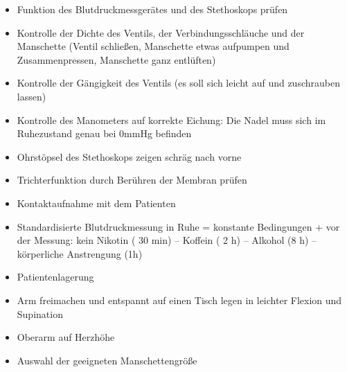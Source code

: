 \documentclass{article}
\begin{document}
\begin{itemize}
\item Funktion des Blutdruckmessger\"ates und des Stethoskops pr\"ufen

\end{itemize}
\begin{itemize}
\item Kontrolle der Dichte des Ventils, der Verbindungsschl\"auche und
der Manschette (Ventil schlie{\ss}en, Manschette etwas aufpumpen und
Zusammenpressen, Manschette ganz entl\"uften)

\item Kontrolle der G\"angigkeit des Ventils (es soll sich leicht auf
und zuschrauben lassen)

\item Kontrolle des Manometers auf korrekte Eichung: Die Nadel muss sich
im Ruhezustand genau bei 0mmHg befinden

\item Ohrst\"opsel des Stethoskops zeigen schr\"ag nach vorne

\item Trichterfunktion durch Ber\"uhren der Membran pr\"ufen

\end{itemize}
\begin{itemize}
\item Kontaktaufnahme mit dem Patienten

\end{itemize}
\begin{itemize}
\item Standardisierte Blutdruckmessung in Ruhe = konstante Bedingungen +
vor der Messung: kein Nikotin ( 30 min) -- Koffein ( 2 h) -- Alkohol (8
h)  {}-- k\"orperliche Anstrengung (1h)

\end{itemize}
\begin{itemize}
\item Patientenlagerung

\end{itemize}
\begin{itemize}
\item Arm freimachen und entspannt auf einen Tisch legen in leichter
Flexion und Supination

\item Oberarm auf Herzh\"ohe

\end{itemize}
\begin{itemize}
\item Auswahl der geeigneten Manschettengr\"o{\ss}e

\end{itemize}
\end{document}

